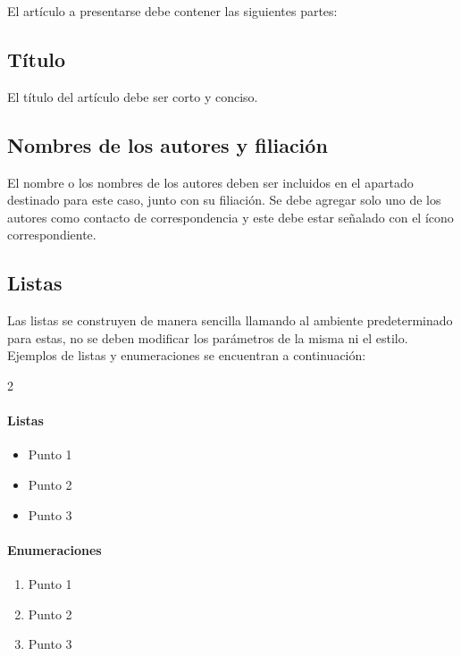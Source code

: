 \documentclass{aleph-revista}
\begin{document}
El artículo a presentarse debe contener las siguientes partes:

\subsection{Título}

El título del artículo debe ser corto y conciso.

\subsection{Nombres de los autores y filiación}

El nombre o los nombres de los autores deben ser incluidos en el apartado destinado para este caso, junto con su filiación. Se debe agregar solo uno de los autores como contacto de correspondencia y este debe estar señalado con el ícono correspondiente.

\subsection{Listas}

Las listas se construyen de manera sencilla llamando al ambiente predeterminado para estas, no se deben modificar los parámetros de la misma ni el estilo. Ejemplos de listas y enumeraciones se encuentran a continuación:

\begin{multicols}{2}
\paragraph{Listas}
\begin{itemize} 
    \item Punto 1
    \item Punto 2
    \item Punto 3
\end{itemize}

\paragraph{Enumeraciones}
\begin{enumerate} 
    \item Punto 1
    \item Punto 2
    \item Punto 3
\end{enumerate}

\end{multicols}
\end{document}
